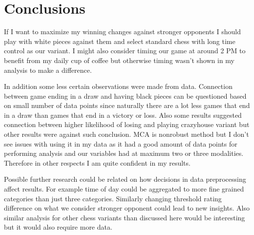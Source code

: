 \section{Conclusions}
\label{sec:conclusions}

If I want to maximize my winning changes against stronger opponents I should play with white pieces against them and select standard chess with long time control as our variant. I might also consider timing our game at around 2 PM to benefit from my daily cup of coffee but otherwise timing wasn't shown in my analysis to make a difference.

In addition some less certain observations were made from data. Connection between game ending in a draw and having black pieces can be questioned based on small number of data points since naturally there are a lot less games that end in a draw than games that end in a victory or loss. Also some results suggested connection between higher likelihood of losing and playing crazyhouse variant but other results were against such conclusion. MCA is nonrobust method but I don't see issues with using it in my data as it had a good amount of data points for performing analysis and our variables had at maximum two or three modalities. Therefore in other respects I am quite confident in my results.

Possible further research could be related on how decisions in data preprocessing affect results. For example time of day could be aggregated to more fine grained categories than just three categories. Similarly changing threshold rating difference on what we consider stronger opponent could lead to new insights. Also similar analysis for other chess variants than discussed here would be interesting but it would also require more data.
